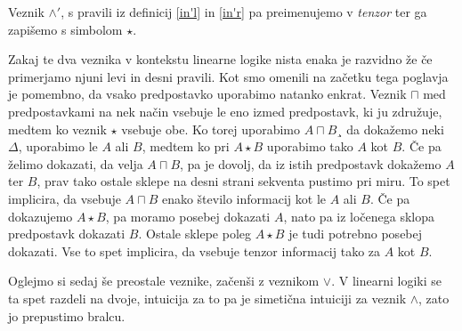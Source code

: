 \begin{definicija} \label{tenzor}
    Veznik $\land'$, s pravili iz definicij \ref{in'l} in \ref{in'r} pa preimenujemo v \emph{tenzor} ter ga zapišemo s simbolom $\star$.
    \begin{center}
        \begin{bprooftree}
        \end{bprooftree}
        \begin{bprooftree}
        \end{bprooftree}
    \end{center}
\end{definicija}

Zakaj te dva veznika v kontekstu linearne logike nista enaka je razvidno že če primerjamo njuni levi in desni pravili. Kot smo omenili na začetku tega poglavja je pomembno, da vsako predpostavko uporabimo natanko enkrat. Veznik $\sqcap$ med predpostavkami na nek način vsebuje le eno izmed predpostavk, ki ju združuje, medtem ko veznik $\star$ vsebuje obe. Ko torej uporabimo $A \sqcap B$¸ da dokažemo neki $\Delta$, uporabimo le $A$ ali $B$, medtem ko pri $A \star B$ uporabimo tako $A$ kot $B$. Če pa želimo dokazati, da velja $A \sqcap B$, pa je dovolj, da iz istih predpostavk dokažemo $A$ ter $B$, prav tako ostale sklepe na desni strani sekventa pustimo pri miru. To spet implicira, da vsebuje $A\sqcap B$ enako število informacij kot le $A$ ali $B$. Če pa dokazujemo $A\star B$, pa moramo posebej dokazati $A$, nato pa iz ločenega sklopa predpostavk dokazati $B$. Ostale sklepe poleg $A\star B$ je tudi potrebno posebej dokazati. Vse to spet implicira, da vsebuje tenzor informacij tako za $A$ kot $B$.

Oglejmo si sedaj še preostale veznike, začenši z veznikom $\lor$. V linearni logiki se ta spet razdeli na dvoje, intuicija za to pa je simetična intuiciji za veznik $\land$, zato jo prepustimo bralcu.

